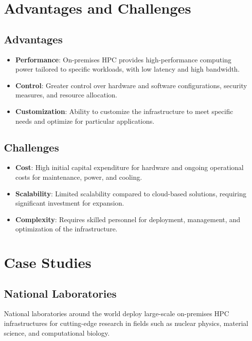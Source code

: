 \section{Advantages and Challenges}

\subsection{Advantages}

\begin{itemize}
    \item \textbf{Performance}: On-premises HPC provides high-performance computing power tailored to specific workloads, with low latency and high bandwidth.
    \item \textbf{Control}: Greater control over hardware and software configurations, security measures, and resource allocation.
    \item \textbf{Customization}: Ability to customize the infrastructure to meet specific needs and optimize for particular applications.
\end{itemize}

\subsection{Challenges}

\begin{itemize}
    \item \textbf{Cost}: High initial capital expenditure for hardware and ongoing operational costs for maintenance, power, and cooling.
    \item \textbf{Scalability}: Limited scalability compared to cloud-based solutions, requiring significant investment for expansion.
    \item \textbf{Complexity}: Requires skilled personnel for deployment, management, and optimization of the infrastructure.
\end{itemize}

\section{Case Studies}

\subsection{National Laboratories}

National laboratories around the world deploy large-scale on-premises HPC infrastructures for cutting-edge research in fields such as nuclear physics, material science, and computational biology.

